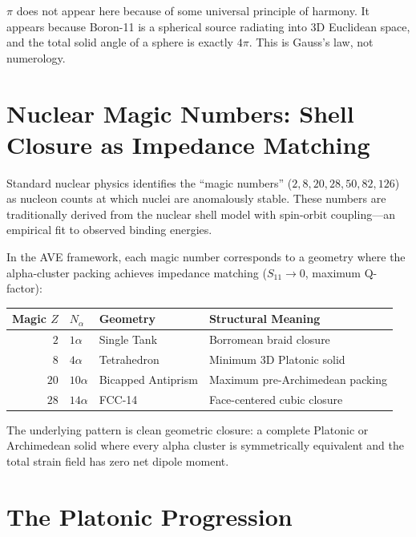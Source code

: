$\pi$ does not appear here because of some universal principle of harmony. It appears because Boron-11 is a spherical source radiating into 3D Euclidean space, and the total solid angle of a sphere is exactly $4\pi$. This is Gauss's law, not numerology.

\section{Nuclear Magic Numbers: Shell Closure as Impedance Matching}
\label{sec:magic_numbers}

Standard nuclear physics identifies the ``magic numbers'' ($2, 8, 20, 28, 50, 82, 126$) as nucleon counts at which nuclei are anomalously stable. These numbers are traditionally derived from the nuclear shell model with spin-orbit coupling---an empirical fit to observed binding energies.

In the AVE framework, each magic number corresponds to a geometry where the alpha-cluster packing achieves impedance matching ($S_{11} \to 0$, maximum Q-factor):
\begin{center}
\renewcommand{\arraystretch}{1.3}
\begin{tabular}{r l l l}
\toprule
\textbf{Magic $Z$} & \textbf{$N_\alpha$} & \textbf{Geometry} & \textbf{Structural Meaning} \\
\midrule
$2$  & $1\alpha$  & Single Tank       & Borromean braid closure \\
$8$  & $4\alpha$  & Tetrahedron       & Minimum 3D Platonic solid \\
$20$ & $10\alpha$ & Bicapped Antiprism & Maximum pre-Archimedean packing \\
$28$ & $14\alpha$ & FCC-14            & Face-centered cubic closure \\
\bottomrule
\end{tabular}
\end{center}

The underlying pattern is clean geometric closure: a complete Platonic or Archimedean solid where every alpha cluster is symmetrically equivalent and the total strain field has zero net dipole moment.

\section{The Platonic Progression}

